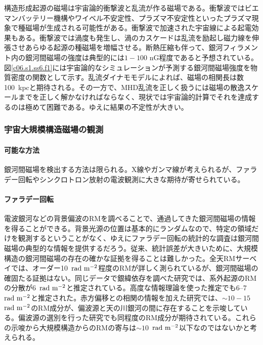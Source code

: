 構造形成起源の磁場は宇宙論的衝撃波と乱流が作る磁場である。衝撃波ではビエマンバッテリー機構\citep{1998A&A...335...19R}やワイベル不安定性\citep{2003ApJ...599..964O}、プラズマ不安定性\citep{2005MNRAS.364..247F}といったプラズマ現象で種磁場が生成される可能性がある。衝撃波で加速された宇宙線による起電効果\citep{2011ApJ...729...73M}もある。衝撃波では渦度も発生し、渦のカスケードは乱流を励起し磁力線を伸張させあらゆる起源の種磁場を増幅させる。断熱圧縮も伴って、銀河フィラメント内の銀河間磁場の強度は典型的には$1-100$ nG程度であると予想されている\citep{2008A&A...482L..13D,2008Sci...320..909R,2010MNRAS.408..684S}。図\ref{c06.s1.ss6.f1}には宇宙論的なシミュレーションが予測する銀河間磁場強度を物質密度の関数として示す。乱流ダイナモモデル\citep{2009ApJ...705L..90C}によれば、磁場の相関長は数100~kpcと期待される。その一方で、MHD乱流を正しく扱うには磁場の散逸スケールまでを正しく解かなければならなく、現状では宇宙論的計算でそれを達成するのは極めて困難である。ゆえに結果の不定性が大きい。

\subsubsection{宇宙大規模構造磁場の観測}
\label{c06.s1.ss6.sss3}

\paragraph{可能な方法}

銀河間磁場を検出する方法は限られる。X線\citep{2009PASJ...61..339N}やガンマ線\citep{2012ApJ...744L...7T}が考えられるが、ファラデー回転やシンクロトロン放射の電波観測に大きな期待が寄せられている。

\paragraph{ファラデー回転}

電波銀河などの背景偏波のRMを調べることで、通過してきた銀河間磁場の情報を得ることができる。背景光源の位置は基本的にランダムなので、特定の領域だけを観測するということがなく、ゆえにファラデー回転の統計的な調査は銀河間磁場の典型的な情報を提供するだろう。従来、統計誤差が大きいために、大規模構造の銀河間磁場の存在の確かな証拠を得ることは難しかった\citep{2006ApJ...637...19X, 1405.5087}。全天RMサーベイ\citep{2009ApJ...702.1230T}では、オーダー10~${\rm rad~m^{-2}}$程度のRMが詳しく測られているが、銀河間磁場の確固たる証拠はない。同じデータで銀緯依存を調べた研究\citep{2010MNRAS.409L..99S}では、系外起源のRMの分散が6~${\rm rad~m^{-2}}$と推定されている。高度な情報理論を使った推定でも6--7~${\rm rad~m^{-2}}$と推定された\citep{1404.3701}。赤方偏移との相関の情報を加えた研究\citep{1209.1438v2}では、$\sim 10-15$~${\rm rad~m^{-2}}$のRM成分が、偏波源と天の川銀河の間に存在することを示唆している。偏波源の選別を行った研究でも同程度のRM成分が期待されている\citep{1405.5087}。これらの示唆から大規模構造からのRMの寄与は$\sim 10$~${\rm rad~m^{-2}}$以下なのではないかと考えられる。

